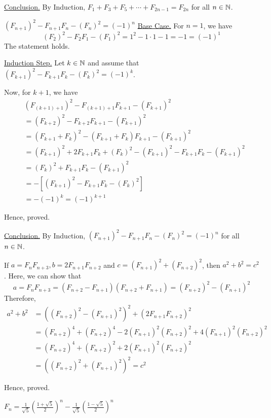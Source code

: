 	\underline{Conclusion.} By Induction, $F_1 + F_3 + F_5 + \cdots + F_{2n-1} = F_{2n}$ for all $n \in \mathbb{N}$.
	\es

\item $(F_{n+1})^2 - F_{n+1}F_n - (F_n)^2 = (-1)^n$
	\bs
	\underline{Base Case.} For $n = 1$, we have
	$$(F_2)^2 - F_2 F_1 - (F_1)^2 = 1^2 - 1 \cdot 1 - 1 = -1 = (-1)^1$$
	The statement holds.

	\underline{Induction Step.} Let $k \in \mathbb{N}$ and assume that $(F_{k+1})^2 - F_{k+1} F_k - (F_k)^2 = (-1)^k$.

	Now, for $k+1$, we have
	\begin{align*}
		&(F_{(k+1)+1})^2 - F_{(k+1)+1} F_{k+1} - (F_{k+1})^2 \\
		&= (F_{k+2})^2 - F_{k+2} F_{k+1} - (F_{k+1})^2 \\
		&= (F_{k+1} + F_k)^2 - (F_{k+1} + F_k) F_{k+1} - (F_{k+1})^2 \\
		&= (F_{k+1})^2 + 2 F_{k+1} F_k + (F_{k})^2 - (F_{k+1})^2 - F_{k+1} F_k - (F_{k+1})^2 \\
		&= (F_k)^2 + F_{k+1}F_k - (F_{k+1})^2 \\
		&= - [(F_{k+1})^2 - F_{k+1}F_k - (F_k)^2] \\
		&= -(-1)^k = (-1)^{k+1}
	\end{align*}

	Hence, proved.

	\underline{Conclusion.} By Induction, $(F_{n+1})^2 - F_{n+1}F_n - (F_n)^2 = (-1)^n$ for all $n \in \mathbb{N}$.
	\es

\item If $a = F_n F_{n+3}, b = 2F_{n+1}F_{n+2}$ and $c = (F_{n+1})^2 + (F_{n+2})^2$, then $a^2 + b^2 = c^2$.
	\bs
	Here, we can show that 
	$$a = F_n F_{n+3} = (F_{n+2} - F_{n+1})(F_{n+2} + F_{n+1}) = (F_{n+2})^2 - (F_{n+1})^2$$
	Therefore, 
	\begin{align*}
		a^2 + b^2 &= ((F_{n+2})^2 - (F_{n+1})^2)^2 + (2F_{n+1}F_{n+2})^2 \\
							&= (F_{n+2})^4 + (F_{n+2})^4 - 2(F_{n+1})^2 (F_{n+2})^2 + 4 (F_{n+1})^2 (F_{n+2})^2 \\
							&= (F_{n+2})^4 + (F_{n+2})^2 + 2(F_{n+1})^2 (F_{n+2})^2 \\
							&= ((F_{n+2})^2 + (F_{n+1})^2)^2 = c^2
	\end{align*}

	Hence, proved.
	\es

\item $\displaystyle F_n = 
			\frac{1}{\sqrt{5}} \left( \frac{1 + \sqrt{5}}{2} \right)^n
			- \frac{1}{\sqrt{5}} \left( \frac{1 - \sqrt{5}}{2} \right)^n$
			
